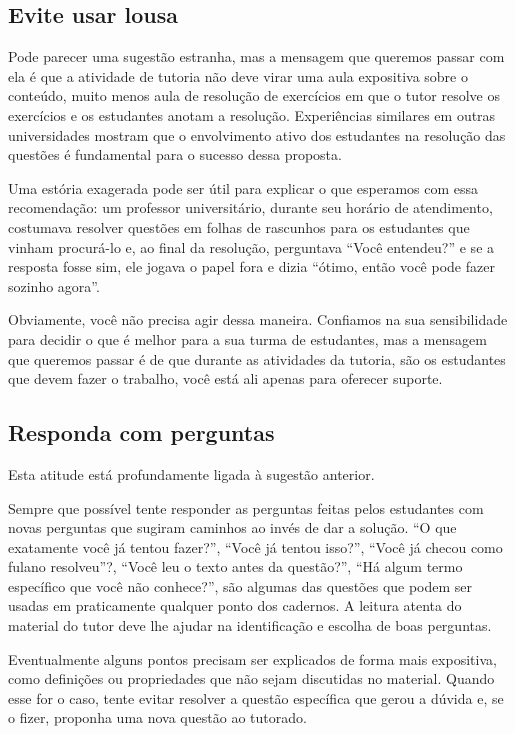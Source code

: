 \subsection{Evite usar lousa}

Pode parecer uma sugestão estranha, mas a mensagem que queremos passar com ela é que a atividade de tutoria não deve virar uma aula expositiva sobre o conteúdo, muito menos aula de resolução de exercícios em que o tutor resolve os exercícios e os estudantes anotam a resolução. Experiências similares em outras universidades mostram que o envolvimento ativo dos estudantes na resolução das questões é fundamental para o sucesso dessa proposta.

Uma estória exagerada pode ser útil para explicar o que esperamos com essa recomendação: um professor universitário, durante seu horário de atendimento, costumava resolver questões em folhas de rascunhos para os estudantes que vinham procurá-lo e, ao final da resolução, perguntava ``Você entendeu?'' e se a resposta fosse sim, ele jogava o papel fora e dizia ``ótimo, então você pode fazer sozinho agora''.

Obviamente, você não precisa agir dessa maneira. Confiamos na sua sensibilidade para decidir o que é melhor para a sua turma de estudantes, mas a mensagem que queremos passar é de que durante as atividades da tutoria, são os estudantes que devem fazer o trabalho, você está ali apenas para oferecer suporte.

\subsection{Responda com perguntas}

Esta atitude está profundamente ligada à sugestão anterior.

Sempre que possível tente responder as perguntas feitas pelos estudantes com novas perguntas que sugiram caminhos ao invés de dar a solução. ``O que exatamente você já tentou fazer?'', ``Você já tentou isso?'', ``Você já checou como fulano resolveu''?, ``Você leu o texto antes da questão?'', ``Há algum termo específico que você não conhece?'', são algumas das questões que podem ser usadas em praticamente qualquer ponto dos cadernos. A leitura atenta do material do tutor deve lhe ajudar na identificação e escolha de boas perguntas.

Eventualmente alguns pontos precisam ser explicados de forma mais expositiva, como definições ou propriedades que não sejam discutidas no material. Quando esse for o caso, tente evitar resolver a questão específica que gerou a dúvida e, se o fizer, proponha uma nova questão ao tutorado. 

